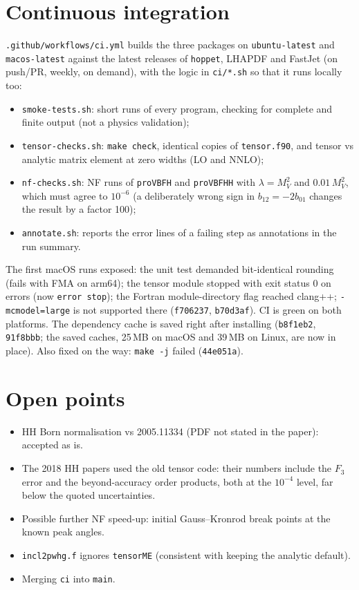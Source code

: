 \documentclass[11pt,a4paper]{article}
\newcommand{\provbfh}{\texttt{proVBFH}\xspace}
\newcommand{\provbfhh}{\texttt{proVBFHH}\xspace}
\newcommand{\hoppet}{\texttt{hoppet}\xspace}
\newcommand{\commit}[1]{\texttt{#1}}
\newcommand{\file}[1]{\texttt{#1}}
\newcommand{\MV}{M_V}
\begin{document}
\section{Continuous integration}

\file{.github/workflows/ci.yml} builds the three packages on
\texttt{ubuntu-latest} and \texttt{macos-latest} against the latest
releases of \hoppet, LHAPDF and FastJet (on push/PR, weekly, on
demand), with the logic in \file{ci/*.sh} so that it runs locally too:
\begin{itemize}
\item \file{smoke-tests.sh}: short runs of every program, checking for
  complete and finite output (not a physics validation);
\item \file{tensor-checks.sh}: \texttt{make check}, identical copies of
  \file{tensor.f90}, and tensor vs analytic matrix element at zero
  widths (LO and NNLO);
\item \file{nf-checks.sh}: NF runs of \provbfh and \provbfhh with
  $\lambda=\MV^2$ and $0.01\,\MV^2$, which must agree to $10^{-6}$ (a
  deliberately wrong sign in $b_{12}=-2b_{01}$ changes the result by a
  factor 100);
\item \file{annotate.sh}: reports the error lines of a failing step as
  annotations in the run summary.
\end{itemize}
The first macOS runs exposed: the unit test demanded bit-identical
rounding (fails with FMA on arm64); the tensor module stopped with exit
status 0 on errors (now \texttt{error stop}); the Fortran
module-directory flag reached clang++; \texttt{-mcmodel=large} is not
supported there (\commit{f706237}, \commit{b70d3af}). CI is green on
both platforms. The dependency cache is saved right after installing
(\commit{b8f1eb2}, \commit{91f8bbb}; the saved caches, 25\,MB on macOS
and 39\,MB on Linux, are now in place). Also fixed on the way:
\texttt{make -j} failed (\commit{44e051a}).

\section{Open points}
\begin{itemize}
\item HH Born normalisation vs 2005.11334 (PDF not stated in the paper):
  accepted as is.
\item The 2018 HH papers used the old tensor code: their numbers
  include the $F_3$ error and the beyond-accuracy order products, both
  at the $10^{-4}$ level, far below the quoted uncertainties.
\item Possible further NF speed-up: initial Gauss--Kronrod break
  points at the known peak angles.
\item \texttt{incl2pwhg.f} ignores \texttt{tensorME} (consistent with
  keeping the analytic default).
\item Merging \texttt{ci} into \texttt{main}.
\end{itemize}
\end{document}
